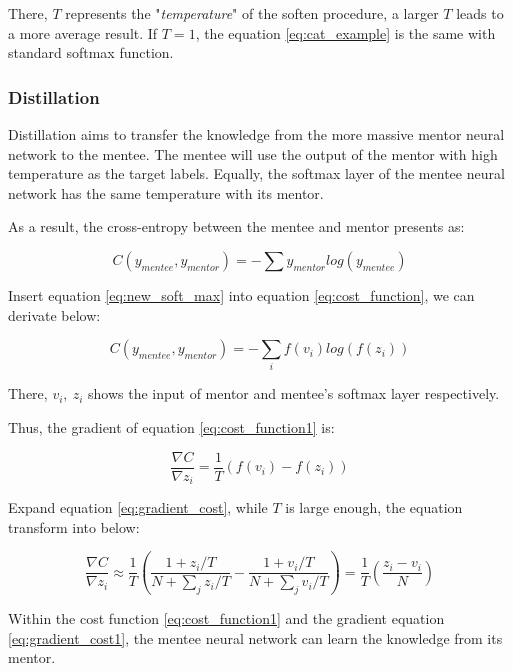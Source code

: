 \documentclass[article]{aaltoseries}
\begin{document}
There, \(T\) represents the "\emph{temperature}" of the soften procedure, a larger \(T\) leads to a more average result. 
If \(T =1\), the equation \ref{eq:cat_example} is the same with standard softmax function. 


\subsubsection{Distillation}

Distillation aims to transfer the knowledge from the more massive mentor neural network to the mentee. 
The mentee will use the output of the mentor with high temperature as the target labels.
Equally, the softmax layer of the mentee neural network has the same temperature with its mentor.

As a result, the cross-entropy between the mentee and mentor presents as:

\begin{equation} \label{eq:cost_function}
  C(y_{mentee}, y_{mentor}) = - \sum y_{mentor}log(y_{mentee})
\end{equation}

Insert equation \ref{eq:new_soft_max} into equation \ref{eq:cost_function}, we can derivate below:

\begin{equation} \label{eq:cost_function1}
  C(y_{mentee}, y_{mentor}) = - \sum_i f(v_i)log(f(z_i))
\end{equation}

There, \(v_i,\ z_i\) shows the input of mentor and mentee's softmax layer respectively.

Thus, the gradient of equation \ref{eq:cost_function1} is:

\begin{equation} \label{eq:gradient_cost}
  \frac{\nabla C}{\nabla z_i} = \frac{1}{T}(f(v_i) - f(z_i))
\end{equation}

Expand equation \ref{eq:gradient_cost}, while \(T\) is large enough, the equation transform into below:

\begin{equation} \label{eq:gradient_cost1}
  \frac{\nabla C}{\nabla z_i} \approx \frac{1}{T}( \frac{1+z_i/T}{N+\sum_j z_i/T} - \frac{1+v_i/T}{N+\sum_j v_i/T} ) = \frac{1}{T} (\frac{z_i - v_i}{N})
\end{equation}

Within the cost function \ref{eq:cost_function1} and the gradient equation \ref{eq:gradient_cost1}, 
the mentee neural network can learn the knowledge from its mentor.
\end{document}
